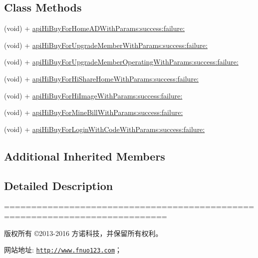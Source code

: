 \subsection*{Class Methods}
\begin{DoxyCompactItemize}
\item 
(void) + \mbox{\hyperlink{interface_j_m_hi_buy_a_p_i_tool_a16fd5bbed4928563cc686fa96cb993ec}{api\+Hi\+Buy\+For\+Home\+A\+D\+With\+Params\+:success\+:failure\+:}}
\item 
(void) + \mbox{\hyperlink{interface_j_m_hi_buy_a_p_i_tool_a0f3defe1659c53cf7ace237a635d5a32}{api\+Hi\+Buy\+For\+Upgrade\+Member\+With\+Params\+:success\+:failure\+:}}
\item 
(void) + \mbox{\hyperlink{interface_j_m_hi_buy_a_p_i_tool_a0153c914d644be423362f63691120f3e}{api\+Hi\+Buy\+For\+Upgrade\+Member\+Operating\+With\+Params\+:success\+:failure\+:}}
\item 
(void) + \mbox{\hyperlink{interface_j_m_hi_buy_a_p_i_tool_a026dae9ac0012f2f65bb8cf33cb5571f}{api\+Hi\+Buy\+For\+Hi\+Share\+Home\+With\+Params\+:success\+:failure\+:}}
\item 
(void) + \mbox{\hyperlink{interface_j_m_hi_buy_a_p_i_tool_a913aeb95bde82de2681cae88c8183b05}{api\+Hi\+Buy\+For\+Hi\+Image\+With\+Params\+:success\+:failure\+:}}
\item 
(void) + \mbox{\hyperlink{interface_j_m_hi_buy_a_p_i_tool_a29ea9eed413508da4e761c5368a99c53}{api\+Hi\+Buy\+For\+Mine\+Bill\+With\+Params\+:success\+:failure\+:}}
\item 
(void) + \mbox{\hyperlink{interface_j_m_hi_buy_a_p_i_tool_afdd2e30124442bb1755ef8b274c116b0}{api\+Hi\+Buy\+For\+Login\+With\+Code\+With\+Params\+:success\+:failure\+:}}
\end{DoxyCompactItemize}
\subsection*{Additional Inherited Members}


\subsection{Detailed Description}
============================================================================

版权所有 ©2013-\/2016 方诺科技，并保留所有权利。

网站地址\+: \href{http://www.fnuo123.com}{\tt http\+://www.\+fnuo123.\+com}； 



